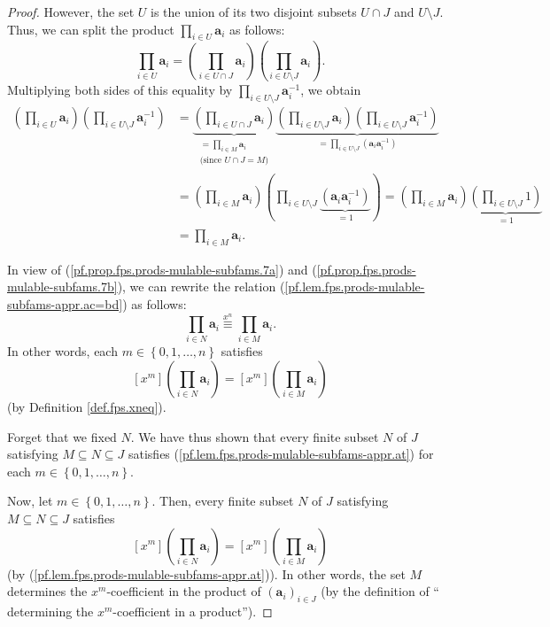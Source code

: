 \begin{fineprint}
\begin{proof}
However, the set $U$ is the union of its two disjoint subsets $U\cap J$ and
$U\setminus J$. Thus, we can split the product $\prod_{i\in U}\mathbf{a}_{i}$
as follows:%
\[
\prod_{i\in U}\mathbf{a}_{i}=\left(  \prod_{i\in U\cap J}\mathbf{a}%
_{i}\right)  \left(  \prod_{i\in U\setminus J}\mathbf{a}_{i}\right)  .
\]
Multiplying both sides of this equality by $\prod_{i\in U\setminus
J}\mathbf{a}_{i}^{-1}$, we obtain%
\begin{align}
\left(  \prod_{i\in U}\mathbf{a}_{i}\right)  \left(  \prod_{i\in U\setminus
J}\mathbf{a}_{i}^{-1}\right)   &  =\underbrace{\left(  \prod_{i\in U\cap
J}\mathbf{a}_{i}\right)  }_{\substack{=\prod_{i\in M}\mathbf{a}_{i}%
\\\text{(since }U\cap J=M\text{)}}}\underbrace{\left(  \prod_{i\in U\setminus
J}\mathbf{a}_{i}\right)  \left(  \prod_{i\in U\setminus J}\mathbf{a}_{i}%
^{-1}\right)  }_{=\prod_{i\in U\setminus J}\left(  \mathbf{a}_{i}%
\mathbf{a}_{i}^{-1}\right)  }\nonumber\\
&  =\left(  \prod_{i\in M}\mathbf{a}_{i}\right)  \left(  \prod_{i\in
U\setminus J}\underbrace{\left(  \mathbf{a}_{i}\mathbf{a}_{i}^{-1}\right)
}_{=1}\right)  =\left(  \prod_{i\in M}\mathbf{a}_{i}\right)
\underbrace{\left(  \prod_{i\in U\setminus J}1\right)  }_{=1}\nonumber\\
&  =\prod_{i\in M}\mathbf{a}_{i}. \label{pf.prop.fps.prods-mulable-subfams.7b}%
\end{align}


In view of (\ref{pf.prop.fps.prods-mulable-subfams.7a}) and
(\ref{pf.prop.fps.prods-mulable-subfams.7b}), we can rewrite the relation
(\ref{pf.lem.fps.prods-mulable-subfams-appr.ac=bd}) as follows:%
\[
\prod_{i\in N}\mathbf{a}_{i}\overset{x^{n}}{\equiv}\prod_{i\in M}%
\mathbf{a}_{i}.
\]
In other words, each $m\in\left\{  0,1,\ldots,n\right\}  $ satisfies
\begin{equation}
\left[  x^{m}\right]  \left(  \prod_{i\in N}\mathbf{a}_{i}\right)  =\left[
x^{m}\right]  \left(  \prod_{i\in M}\mathbf{a}_{i}\right)
\label{pf.lem.fps.prods-mulable-subfams-appr.at}%
\end{equation}
(by Definition \ref{def.fps.xneq}).

Forget that we fixed $N$. We have thus shown that every finite subset $N$ of
$J$ satisfying $M\subseteq N\subseteq J$ satisfies
(\ref{pf.lem.fps.prods-mulable-subfams-appr.at}) for each $m\in\left\{
0,1,\ldots,n\right\}  $.

Now, let $m\in\left\{  0,1,\ldots,n\right\}  $. Then, every finite subset $N$
of $J$ satisfying $M\subseteq N\subseteq J$ satisfies%
\[
\left[  x^{m}\right]  \left(  \prod_{i\in N}\mathbf{a}_{i}\right)  =\left[
x^{m}\right]  \left(  \prod_{i\in M}\mathbf{a}_{i}\right)
\]
(by (\ref{pf.lem.fps.prods-mulable-subfams-appr.at})). In other words, the set
$M$ determines the $x^{m}$-coefficient in the product of $\left(
\mathbf{a}_{i}\right)  _{i\in J}$ (by the definition of \textquotedblleft
determining the $x^{m}$-coefficient in a product\textquotedblright).


\end{proof}
\end{fineprint}
